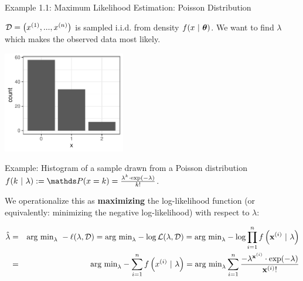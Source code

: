 \begin{vbframe}{Example 1.1: Maximum Likelihood Estimation: Poisson Distribution}
	
$\mathcal{D} = \left(x^{(1)}, ..., x^{(n)}\right)$ is sampled i.i.d. from density $f(x ~|~ \bm{\theta})$. We want to find $\lambda$ which makes the observed data most likely.

\begin{center}
	\includegraphics[width=0.4\textwidth, height=0.4\textwidth]{figure_man/ml_poisson_example_1.pdf} \\
	\begin{footnotesize}
		Example: Histogram of a sample drawn from a Poisson distribution $f(k ~|~ \lambda) := \P(x = k) = \frac{\lambda^k \cdot \exp(-\lambda)}{k!}$. 
	\end{footnotesize}
\end{center}

\framebreak 

 We operationalize this as \textbf{maximizing} the log-likelihood function (or equivalently: minimizing the negative log-likelihood) with respect to $\lambda$:

\begin{footnotesize}
\begin{eqnarray*}
	\hat \lambda  &=& \text{arg min}_\lambda ~ - \ell(\lambda, \mathcal{D}) =\text{arg min}_\lambda  - \log \mathcal{L}(\lambda, \mathcal{D}) = \text{arg min}_\lambda - \log \prod_{i = 1}^n  f\left(\mathbf{x}^{(i)} ~|~ \lambda\right) \\ &=& \text{arg min}_\lambda - \sum\limits_{i=1}^n f\left(x^{(i)} ~|~ \lambda\right) = \text{arg min}_\lambda \sum\limits_{i=1}^n \frac{- \lambda^{\mathbf{x}^{(i)}} \cdot \exp(- \lambda)}{\mathbf{x}^{(i)}!} 
\end{eqnarray*}
\end{footnotesize}


\end{vbframe}
